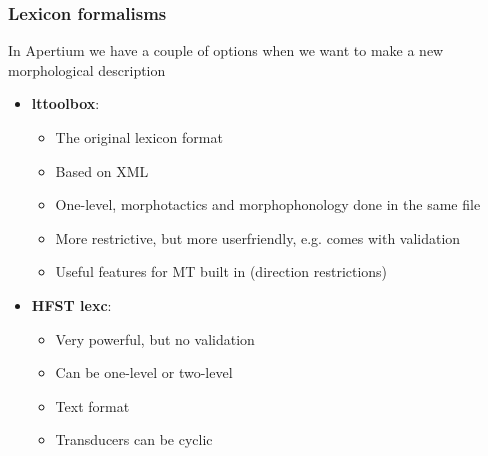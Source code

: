 \documentclass[10pt,xetex]{beamer} %
\begin{document}
\begin{frame}
  \frametitle{Lexicon formalisms}

In Apertium we have a couple of options when we want to make a new morphological description

\begin{itemize}
  \item {\bf lttoolbox}:
  \begin{itemize}
    \item The original lexicon format
    \item Based on XML
    \item One-level, morphotactics and morphophonology done in the same file
    \item More restrictive, but more userfriendly, e.g. comes with validation
    \item Useful features for MT built in (direction restrictions)
  \end{itemize}
  \item {\bf HFST lexc}:
  \begin{itemize}
    \item Very powerful, but no validation
    \item Can be one-level or two-level
    \item Text format
    \item Transducers can be cyclic
  \end{itemize}
\end{itemize}


\end{frame}
%
%
%
%
%
\end{document}
